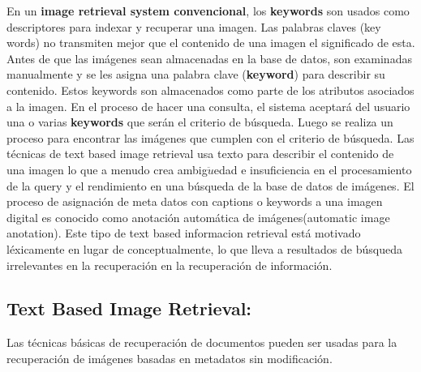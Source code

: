 \documentclass{llncs}
\begin{document}
En un \textbf{image retrieval system convencional}, los \textbf{keywords} son 
usados como descriptores para indexar y recuperar una imagen.  Las palabras 
claves (key words) no transmiten mejor que el contenido de una imagen 
el significado de esta. Antes de que las imágenes sean almacenadas en la base de datos, son examinadas 
manualmente y se les asigna una palabra  clave (\textbf{keyword}) para describir su 
contenido. Estos  keywords  son almacenados como parte de los atributos 
asociados a la imagen. En el proceso de hacer una consulta, el sistema 
aceptará del usuario una o varias \textbf{keywords} que serán el criterio de búsqueda.
Luego se realiza un proceso para encontrar las imágenes que cumplen con el criterio 
de búsqueda. Las t\'ecnicas de text based image retrieval usa texto para describir el 
contenido de una imagen lo que a menudo crea ambig$\ddot{u}$edad e insuficiencia en el 
procesamiento de la query y el rendimiento en una b\'usqueda de la base de datos de 
im\'agenes. El proceso de asignaci\'on de meta datos con captions o keywords a una imagen
digital es conocido como anotaci\'on autom\'atica de im\'agenes(automatic image anotation).
Este tipo de text based informacion retrieval est\'a motivado l\'exicamente en lugar de 
conceptualmente, lo que lleva a resultados de b\'usqueda irrelevantes en la recuperaci\'on en la 
recuperaci\'on de informaci\'on.

\subsection{Text Based Image Retrieval:}

Las t\'ecnicas b\'asicas de recuperaci\'on de documentos pueden ser usadas para la recuperaci\'on
de im\'agenes basadas en metadatos sin modificaci\'on. 
\newpage
\end{document}
